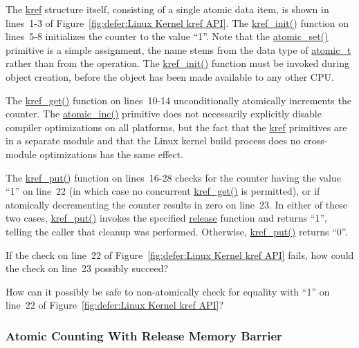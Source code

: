 The \url{kref} structure itself, consisting of a single atomic
data item, is shown in lines~1-3 of
Figure~\ref{fig:defer:Linux Kernel kref API}.
The \url{kref_init()} function on lines~5-8 initializes the counter
to the value ``1''.
Note that the \url{atomic_set()} primitive is a simple
assignment, the name stems from the data type of \url{atomic_t}
rather than from the operation.
The \url{kref_init()} function must be invoked during object creation,
before the object has been made available to any other CPU.

The \url{kref_get()} function on lines~10-14 unconditionally atomically
increments the counter.
The \url{atomic_inc()} primitive does not necessarily explicitly
disable compiler
optimizations on all platforms, but the fact that the \url{kref}
primitives are in a separate module and that the Linux kernel build
process does no cross-module optimizations has the same effect.

The \url{kref_put()} function on lines~16-28 checks for the counter having the
value ``1'' on line~22
(in which case no concurrent \url{kref_get()} is permitted),
or if atomically decrementing the counter results in zero on line~23.
In either of these two cases, \url{kref_put()} invokes the
specified \url{release} function and returns ``1'', telling the
caller that cleanup was performed.
Otherwise, \url{kref_put()} returns ``0''.

\QuickQuiz{}
	If the check on line~22 of
	Figure~\ref{fig:defer:Linux Kernel kref API} fails, how
	could the check on line~23 possibly succeed?
 \QuickQuizEnd

\QuickQuiz{}
	How can it possibly be safe to non-atomically check for equality
	with ``1'' on line~22 of
	Figure~\ref{fig:defer:Linux Kernel kref API}?
 \QuickQuizEnd

\subsubsection{Atomic Counting With Release Memory Barrier}
\label{sec:defer:Atomic Counting With Release Memory Barrier}

